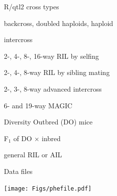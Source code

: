 \documentclass[12pt,t,aspectratio=1610]{beamer}
\begin{document}
\begin{frame}{R/qtl2 cross types}

\vspace*{10mm}

\bi
\item backcross, doubled haploids, haploid

\item intercross

\item 2-, 4-, 8-, 16-way RIL by selfing

\item 2-, 4-, 8-way RIL by sibling mating

\item 2-, 3-, 8-way advanced intercross

\item 6- and 19-way MAGIC

\item Diversity Outbred (DO) mice

\item F$_1$ of DO $\times$ inbred

\item general RIL or AIL
\ei

\end{frame}










\begin{frame}{Data files}

\texttt{[image: Figs/phefile.pdf]}






\end{frame}
\end{document}
